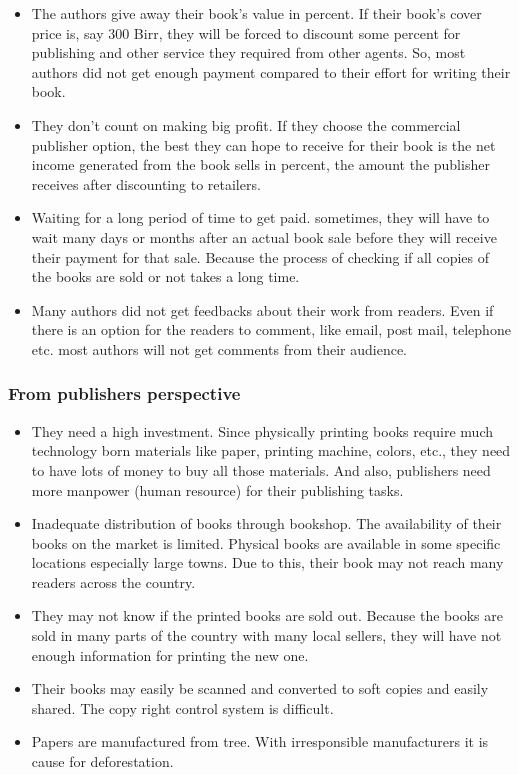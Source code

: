 \begin{itemize}
	\item The authors give away their book’s value in percent. If their book's cover price is, say 300 Birr, they will be forced to discount some percent for publishing and other service they required from other agents. So, most authors did not get enough payment compared to their effort for writing their book.
	\item They don't count on making big profit. If they choose the commercial publisher option, the best they can hope to receive for their book is the net income generated from the book sells in percent, the amount the publisher receives after discounting to retailers.
	\item Waiting for a long period of time to get paid. sometimes, they will have to wait many days or months after an actual book sale before they will receive their payment for that sale. Because the process of checking if all copies of the books are sold or not takes a long time.
	\item Many authors did not get feedbacks about their work from readers. Even if there is an option for the readers to comment, like email, post mail, telephone etc. most authors will not get comments from their audience.
\end{itemize}

		\subsubsection{From publishers perspective}

\begin{itemize}
	\item They need a high investment. Since physically printing books require much technology born materials like paper, printing machine, colors, etc., they need to have lots of money to buy all those materials. And also, publishers need more manpower (human resource) for their publishing tasks.
	\item Inadequate distribution of books through bookshop. The availability of their books on the market is limited. Physical books are available in some specific locations especially large towns. Due to this, their book may not reach many readers across the country.
	\item They may not know if the printed books are sold out. Because the books are sold in many parts of the country with many local sellers, they will have not enough information for printing the new one.
	\item Their books may easily be scanned and converted to soft copies and easily shared. The copy right control system is difficult.
	\item Papers are manufactured from tree. With irresponsible manufacturers it is cause for deforestation.
\end{itemize}

